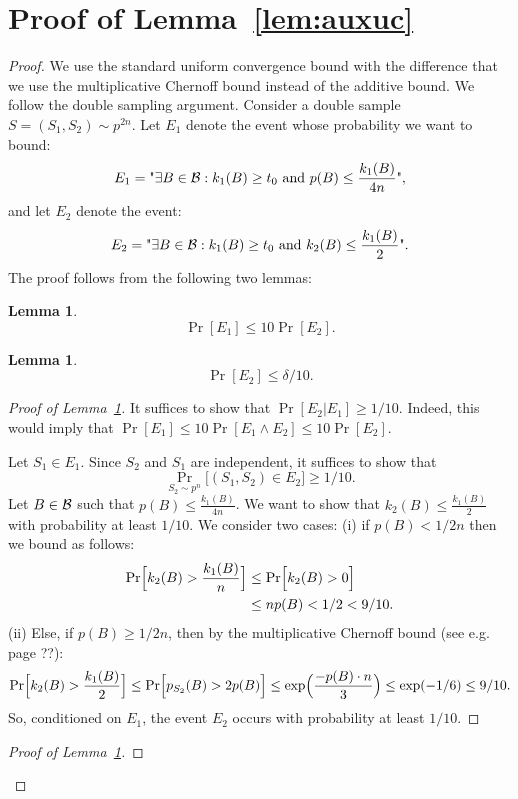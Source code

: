 \documentclass{article}
\newtheorem{lemma}[theorem]{Lemma}
\newcommand{\B}{{\cal B}}
\newcommand{\samp}{S}
\begin{document}
\section{Proof of Lemma~\ref{lem:auxuc}}\label{sec:auxuc}
\begin{proof}
We use the standard uniform convergence bound with
the difference that we use the multiplicative Chernoff bound instead
of the additive bound. 
We follow the double sampling argument.
Consider a double sample $S=(\samp_1,\samp_2)\sim p^{2n}$.
Let $E_1$ denote the event whose probability we want to bound:
\[
E_1 = \text{"}\exists {B\in\B}:
  k_1(B) \geq t_0 \mbox{ and } p(B) \leq \frac{k_1(B)}{4n}
\text{"}, 
\]
and let $E_2$ denote the event:
\[
E_2 = \text{"}\exists {B\in\B}:
  k_1(B) \geq t_0 \mbox{ and }k_2(B) \leq \frac{k_1(B)}{2}
\text{"}.
\]
The proof follows from the following two lemmas:
\begin{lemma}\label{lem:auxuc1}
\[\Pr[E_1]\leq 10\Pr[E_2].\]
\end{lemma}
\begin{lemma}\label{lem:auxuc2}
\[\Pr[E_2]\leq \delta/10.\]
\end{lemma}
\begin{proof}[Proof of Lemma~\ref{lem:auxuc1}]
It suffices to show that $\Pr[E_2 \vert E_1]\geq 1/10$.
Indeed, this would imply that 
$\Pr[E_1] \leq 10\Pr[E_1 \land E_2]\leq 10\Pr[E_2]$.

Let $S_1\in E_1$. Since $S_2$ and $S_1$ are independent,
it suffices to show that 
\[\Pr_{S_2\sim p^n}\bigl[(S_1,S_2)\in E_2\bigr] \geq 1/10.\]
Let $B\in\B$ such that $p(B)\leq \frac{k_1(B)}{4n}$.
We want to show that $k_2(B)\leq \frac{k_1(B)}{2}$ with probability at least $1/10$.
We consider two cases:
(i) if $p(B) < 1/2n$
then we bound as follows:
\begin{align*}
\Pr\Bigl[ k_2(B) > \frac{k_1(B)}{n}\Bigr]
&\leq
\Pr\Bigl[ k_2(B) > 0 \Bigr]\\
&\leq np(B) < 1/2 < 9/10.
\end{align*}
(ii) Else, if $p(B) \geq 1/2n$, then by the multiplicative Chernoff bound (see e.g.\cite{} page ??):
\[
\Pr\Bigl[ k_2(B) > \frac{k_1(B)}{2}\Bigr]
\leq
\Pr\Bigl[ p_{\samp_2}(B) > 2p(B)\Bigr]
\leq
\exp\Bigl( \frac{-p(B)\cdot n}{3}\Bigr)\leq \exp(-1/6)\leq 9/10.
\]
So, conditioned on $E_1$, 
the event $E_2$ occurs with probability at least $1/10$.


\end{proof}

\begin{proof}[Proof of Lemma~\ref{lem:auxuc2}]


\end{proof}
\end{proof}
\end{document}
